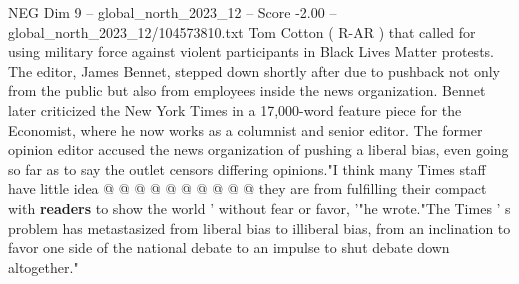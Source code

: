 \begin{textsample}{NEG Dim 9 – global\_north\_2023\_12 – Score -2.00 – global\_north\_2023\_12/104573810.txt}
Tom Cotton ( R-AR ) that called for using military force against violent participants in Black Lives Matter protests.
The editor, James Bennet, stepped down shortly after due to pushback not only from the public but also from employees inside the news organization.
Bennet later criticized the New York Times in a 17,000-word feature piece for the Economist, where he now works as a columnist and senior editor.
The former opinion editor accused the news organization of pushing a liberal bias, even going so far as to say the outlet censors differing opinions."I think many Times staff have little idea @ @ @ @ @ @ @ @ @ @ they are from fulfilling their compact with \textbf{readers} to show the world ' without fear or favor, '"he wrote."The Times ' s problem has metastasized from liberal bias to illiberal bias, from an inclination to favor one side of the national debate to an impulse to shut debate down altogether."

\end{textsample}
